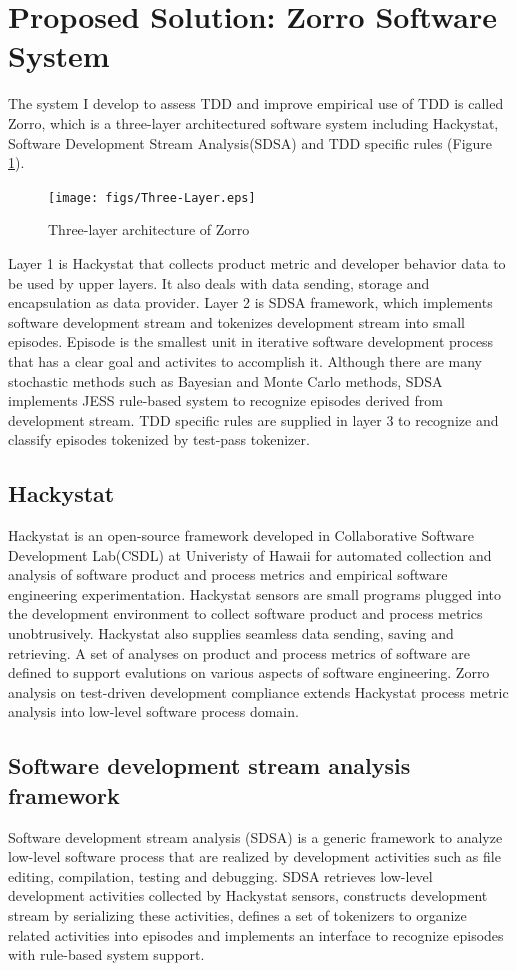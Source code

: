 \section{Proposed Solution: Zorro Software System}
The system I develop to assess TDD and improve empirical use of TDD is
called Zorro, which is a three-layer architectured software system
including Hackystat, Software Development Stream Analysis(SDSA) and TDD
specific rules (Figure \ref{fig:ThreeLayer}). 
\begin{figure}[htbp] 
  \centering
  \texttt{[image: figs/Three-Layer.eps]}
  \caption{Three-layer architecture of Zorro}\label{fig:ThreeLayer}
\end{figure} 
Layer 1 is Hackystat that collects product metric and developer behavior
data to be used by upper layers. It also deals with data sending, storage
and encapsulation as data provider. Layer 2 is SDSA framework, which
implements software development stream and tokenizes development stream
into small episodes. Episode is the smallest unit in iterative software
development process that has a clear goal and activites to accomplish it.
Although there are many stochastic methods such as Bayesian and Monte Carlo
methods, SDSA implements JESS\cite{Friedman-Hill:03} rule-based system to
recognize episodes derived from development stream. TDD specific rules are
supplied in layer 3 to recognize and classify episodes tokenized by
test-pass tokenizer.

\subsection{Hackystat}
Hackystat\cite{Hackystat} is an open-source framework developed in
Collaborative Software Development Lab(CSDL) at Univeristy of Hawaii for
automated collection and analysis of software product and process metrics
and empirical software engineering experimentation. Hackystat sensors are
small programs plugged into the development environment to collect software
product and process metrics unobtrusively. Hackystat also supplies seamless
data sending, saving and retrieving. A set of analyses on product and
process metrics of software are defined to support evalutions on various
aspects of software engineering. Zorro analysis on test-driven development
compliance extends Hackystat process metric analysis into low-level
software process domain.

\subsection{Software development stream analysis framework}
Software development stream analysis (SDSA) is a generic framework to
analyze low-level software process that are realized by development
activities such as file editing, compilation, testing and debugging. SDSA
retrieves low-level development activities collected by Hackystat sensors,
constructs development stream by serializing these activities, defines a
set of tokenizers to organize related activities into episodes and
implements an interface to recognize episodes with rule-based system
support.

